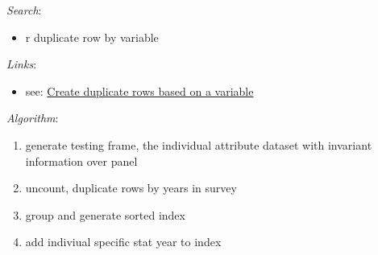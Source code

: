 \documentclass[
]{book}
\providecommand{\tightlist}{%
  \setlength{\itemsep}{0pt}\setlength{\parskip}{0pt}}
\begin{document}
\emph{Search}:

\begin{itemize}
\tightlist
\item
  r duplicate row by variable
\end{itemize}

\emph{Links}:

\begin{itemize}
\tightlist
\item
  see: \href{https://stackoverflow.com/questions/52498169/r-create-duplicate-rows-based-on-a-variable-dplyr-preferred}{Create duplicate rows based on a variable}
\end{itemize}

\emph{Algorithm}:

\begin{enumerate}
\def\labelenumi{\arabic{enumi}.}
\tightlist
\item
  generate testing frame, the individual attribute dataset with invariant information over panel
\item
  uncount, duplicate rows by years in survey
\item
  group and generate sorted index
\item
  add indiviual specific stat year to index
\end{enumerate}
\end{document}
